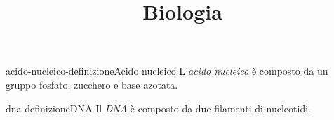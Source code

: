 \documentclass[preview]{standalone}
\begin{document}
\title{Biologia}
\genpage


\begin{snippetdefinition}{acido-nucleico-definizione}{Acido nucleico}
    L'\textit{acido nucleico} è composto da un gruppo fosfato, zucchero e base azotata.
\end{snippetdefinition}

\begin{snippetdefinition}{dna-definizione}{DNA}
    Il \textit{DNA} è composto da due filamenti di nucleotidi.
\end{snippetdefinition}

\end{document}
